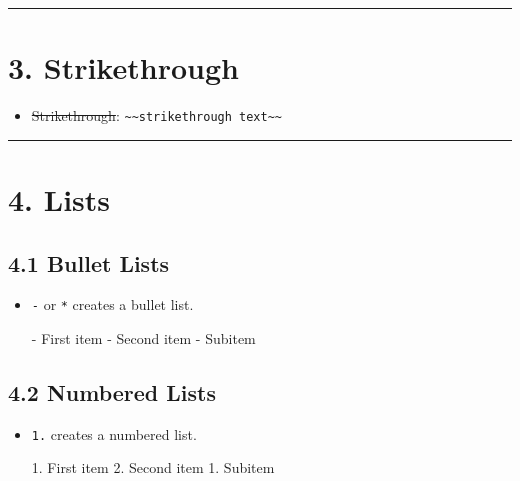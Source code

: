 \documentclass[
]{book}
\newenvironment{Shaded}{\begin{snugshade}}{\end{snugshade}}
\newcommand{\NormalTok}[1]{#1}
\newcommand{\SpecialStringTok}[1]{\textcolor[rgb]{0.31,0.60,0.02}{#1}}
\providecommand{\tightlist}{%
  \setlength{\itemsep}{0pt}\setlength{\parskip}{0pt}}
\theoremstyle{definition}
\theoremstyle{definition}
\theoremstyle{definition}
\theoremstyle{definition}
\theoremstyle{remark}
\begin{document}
\begin{center}\rule{0.5\linewidth}{0.5pt}\end{center}

\section{3. Strikethrough}\label{strikethrough}

\begin{itemize}
\tightlist
\item
  \st{Strikethrough}: \texttt{\textasciitilde{}\textasciitilde{}strikethrough\ text\textasciitilde{}\textasciitilde{}}
\end{itemize}

\begin{center}\rule{0.5\linewidth}{0.5pt}\end{center}

\section{4. Lists}\label{lists}

\subsection{4.1 Bullet Lists}\label{bullet-lists}

\begin{itemize}
\item
  \texttt{-} or \texttt{*} creates a bullet list.

\begin{Shaded}
\begin{Highlighting}[]
\SpecialStringTok{{-} }\NormalTok{First item}
\SpecialStringTok{{-} }\NormalTok{Second item}
\SpecialStringTok{  {-} }\NormalTok{Subitem}
\end{Highlighting}
\end{Shaded}
\end{itemize}

\subsection{4.2 Numbered Lists}\label{numbered-lists}

\begin{itemize}
\item
  \texttt{1.} creates a numbered list.

\begin{Shaded}
\begin{Highlighting}[]
\SpecialStringTok{1. }\NormalTok{First item}
\SpecialStringTok{2. }\NormalTok{Second item}
\SpecialStringTok{   1. }\NormalTok{Subitem}
\end{Highlighting}
\end{Shaded}
\end{itemize}
\end{document}
